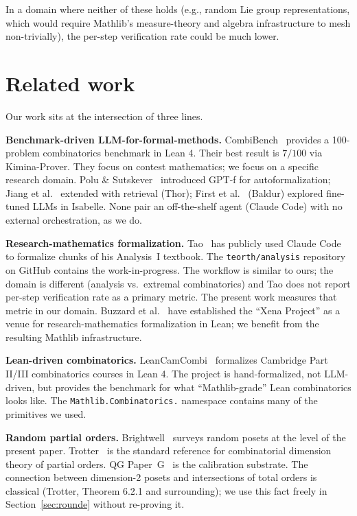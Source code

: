 \documentclass[11pt]{article}
\theoremstyle{definition}
\begin{document}
In a domain where neither of these holds (e.g., random Lie group representations,
which would require Mathlib's measure-theory and algebra infrastructure to
mesh non-trivially), the per-step verification rate could be much lower.

\section{Related work}\label{sec:related}

Our work sits at the intersection of three lines.

\textbf{Benchmark-driven LLM-for-formal-methods.} CombiBench~\cite{combibench}
provides a 100-problem combinatorics benchmark in Lean 4. Their best result is
$7/100$ via Kimina-Prover. They focus on contest mathematics; we focus on a
specific research domain. Polu \& Sutskever~\cite{polu_sutskever} introduced
GPT-f for autoformalization; Jiang et al.~\cite{jiang_thor} extended with
retrieval (Thor); First et al.~\cite{first_baldur} (Baldur) explored fine-tuned
LLMs in Isabelle. None pair an off-the-shelf agent (Claude Code) with no
external orchestration, as we do.

\textbf{Research-mathematics formalization.} Tao~\cite{tao_lean_claude} has
publicly used Claude Code to formalize chunks of his Analysis~I textbook. The
\texttt{teorth/analysis} repository on GitHub contains the work-in-progress.
The workflow is similar to ours; the domain is different (analysis vs.\
extremal combinatorics) and Tao does not report per-step verification rate
as a primary metric. The present work measures that metric in our domain.
Buzzard et al.~\cite{buzzard_xena} have established the ``Xena Project'' as
a venue for research-mathematics formalization in Lean; we benefit from the
resulting Mathlib infrastructure.

\textbf{Lean-driven combinatorics.} LeanCamCombi~\cite{leancamcombi}
formalizes Cambridge Part II/III combinatorics courses in Lean 4. The project
is hand-formalized, not LLM-driven, but provides the benchmark for what
``Mathlib-grade'' Lean combinatorics looks like. The
\texttt{Mathlib.Combinatorics.} namespace contains many of the primitives we
used.

\textbf{Random partial orders.} Brightwell~\cite{brightwell_random_posets}
surveys random posets at the level of the present paper.
Trotter~\cite{trotter} is the standard reference for combinatorial dimension
theory of partial orders. QG Paper~G~\cite{qg_paper_g} is the calibration
substrate. The connection between dimension-2 posets and intersections of total
orders is classical (Trotter, Theorem 6.2.1 and surrounding); we use this fact
freely in Section~\ref{sec:rounde} without re-proving it.
\end{document}
